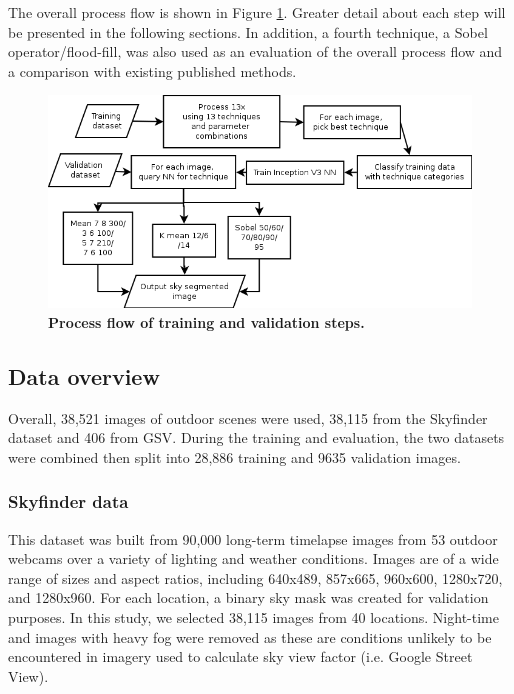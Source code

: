 \documentclass[final,3p,times,authoryear]{elsarticle}
\begin{document}
The overall process flow is shown in Figure \ref{fig:process}. Greater detail about each step will be presented in the following sections. In addition, a fourth technique, a Sobel operator/flood-fill, was also used as an evaluation of the overall process flow and a comparison with existing published methods.

\begin{figure}
\centering    
\includegraphics[scale=0.70]{Images/TrainingProcessDiagram}
\caption{\bf Process flow of training and validation steps.}    
 \label{fig:process}  
\end{figure} 


\subsection{Data overview}\label{sec:data}
Overall, 38,521 images of outdoor scenes were used, 38,115 from the Skyfinder dataset and 406 from GSV. During the training and evaluation, the two datasets were combined then split into 28,886 training and 9635 validation images.


\subsubsection{Skyfinder data}\label{sec:finderdata}
This dataset was built from 90,000 long-term timelapse images from 53 outdoor webcams over a variety of lighting and weather conditions. Images are of a wide range of sizes and aspect ratios, including 640x489, 857x665, 960x600, 1280x720, and 1280x960. For each location, a binary sky mask was created for validation purposes. In this study, we selected 38,115 images from 40 locations. Night-time and images with heavy fog were removed as these are conditions unlikely to be encountered in imagery used to calculate sky view factor (i.e. Google Street View).
\end{document}
